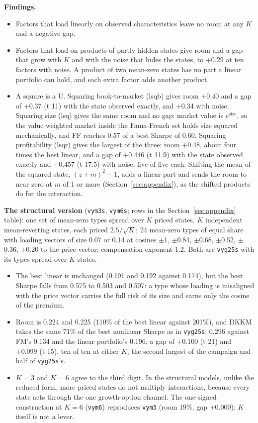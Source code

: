 \documentclass[11pt]{article}
\begin{document}
\textbf{Findings.}

\begin{itemize}
\item Factors that load linearly on observed characteristics leave no room at any $K$ and a negative gap.
\item Factors that load on products of partly hidden states give room and a gap that grow with $K$ and with the noise that hides the states, to +0.29 at ten factors with noise. A product of two mean-zero states has no part a linear portfolio can hold, and each extra factor adds another product.
\item A square is a U. Squaring book-to-market (lsqb) gives room +0.40 and a gap of +0.37 (t 11) with the state observed exactly, and +0.34 with noise. Squaring size (lsq) gives the same room and no gap: market value is $e^{\mathrm{size}}$, so the value-weighted market inside the Fama-French set holds size squared mechanically, and FF reaches 0.57 of a best Sharpe of 0.60. Squaring profitability (lsqr) gives the largest of the three: room +0.48, about four times the best linear, and a gap of +0.446 (t 11.9) with the state observed exactly and +0.457 (t 17.5) with noise, five of five each. Shifting the mean of the squared state, $(z + m)^2 - 1$, adds a linear part and sends the room to near zero at $m$ of 1 or more (Section~\ref{sec:appendix}), as the shifted products do for the interaction.
\end{itemize}
\textbf{The structural version} (\texttt{vym3s}, \texttt{vym6s}; rows in the Section~\ref{sec:appendix} table): one set of mean-zero types spread over $K$ priced states. $K$ independent mean-reverting states, each priced $2.5/\sqrt{K}$; 24 mean-zero types of equal share with loading vectors of size 0.07 or 0.14 at cosines $\pm$1, $\pm$0.84, $\pm$0.68, $\pm$0.52, $\pm$0.36, $\pm$0.20 to the price vector; compensation exponent 1.2. Both are \texttt{vyg25s} with its types spread over $K$ states.

\begin{itemize}
\item The best linear is unchanged (0.191 and 0.192 against 0.174), but the best Sharpe falls from 0.575 to 0.503 and 0.507: a type whose loading is misaligned with the price vector carries the full risk of its size and earns only the cosine of the premium.
\item Room is 0.224 and 0.225 (110\% of the best linear against 201\%), and DKKM takes the same 71\% of the best nonlinear Sharpe as in \texttt{vyg25s}: 0.296 against FM's 0.134 and the linear portfolio's 0.196, a gap of +0.100 (t 21) and +0.099 (t 15), ten of ten at either $K$, the second largest of the campaign and half of \texttt{vyg25s}'s.
\item $K = 3$ and $K = 6$ agree to the third digit. In the structural models, unlike the reduced form, more priced states do not multiply interactions, because every state acts through the one growth-option channel. The one-signed construction at $K = 6$ (\texttt{vym6}) reproduces \texttt{vym3} (room 19\%, gap +0.000): $K$ itself is not a lever.
\end{itemize}
\end{document}

